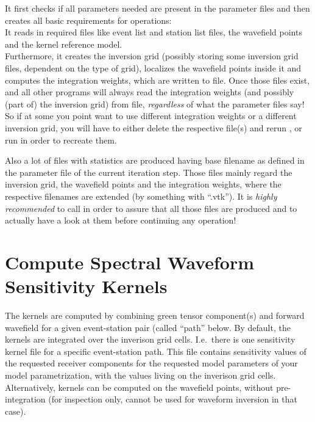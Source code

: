 It first checks if all parameters needed are present in the parameter files and then creates all
basic requirements for \ASKI operations:\\
It reads in required files like event list and station list files, the wavefield points and the 
kernel reference model. \\
Furthermore, it creates the inversion grid (possibly storing some inversion grid files, dependent 
on the type of grid), localizes the wavefield points inside it and computes 
the integration weights, which are written to file. Once those files exist,  
and all other programs will always read the integration weights (and possibly (part of) the inversion grid) 
from file, \emph{regardless} of what the parameter files say! So if at some you point want to use 
different integration weights or a different inversion grid, you will have to either delete the respective 
file(s) and rerun , or run  in order
to recreate them. 

Also a lot of  files with statistics are produced having base filename  as 
defined in the parameter file of the current iteration step. Those files mainly regard the inversion grid, 
the wavefield points and the integration weights, where the respective filenames are extended (by something 
with ``.vtk''). It is \emph{highly recommended} to call  in order to assure that all
those  files are produced and to actually have a look at them before continuing any \ASKI operation!
%
\section{Compute Spectral Waveform Sensitivity Kernels} \label{basic_steps,sec:compute_kernels}
%
The kernels are computed by combining green tensor component(s) and forward wavefield for a given event-station
pair (called ``path'' below. By default, the kernels are integrated over the inverison grid cells. I.e.\ there is one sensitivity 
kernel file for a specific event-station path. This file contains sensitivity values of the requested 
receiver components for the requested model parameters of your model parametrization, with 
the values living on the inverison grid cells. Alternatively, kernels can be computed on the wavefield points,
without pre-integration (for inspection only, cannot be used for waveform inversion in that case).

